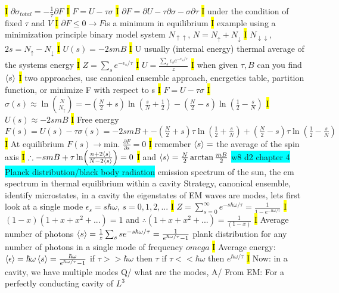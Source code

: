\documentclass[fontsize=4pt]{scrartcl}
\begin{document}
\hl{I}
$\partial \sigma_{total} = - \frac{1}{\tau} \partial F$
\hl{I}
$F=U-\tau \sigma$
\hl{I}
$\partial F = \partial U - \tau \partial \sigma - \sigma \partial \tau$
\hl{I}
under the condition of fixed $\tau$ and $V$
\hl{I}
$\partial F \leq 0 \rightarrow F$is a minimum in equilibrium
\hl{I}
\colorbox{RubineRed}{example using a minimization principle}
binary model system $N_{\uparrow \uparrow}$, $N = N_{\uparrow} + N_{\downarrow}$
\hl{I}
$N_{\downarrow \downarrow}$, $2s = N_{\uparrow} - N_{\downarrow}$
\hl{I}
$U(s) = -2smB$
\hl{I}
U usually (internal energy) thermal average of the systems energy
\hl{I}
$Z=\sum_s e^{-\epsilon_s / \tau}$
\hl{I}
$U = \frac{\sum_s \epsilon_s e^{-\epsilon_s / \tau}}{z}$
\hl{I}
when given $\tau, B$ can you find $\expval{s}$
\hl{I}
two approaches, use canonical ensemble approach, energetics table, partition function, or minimize F with respect to s
\hl{I}
$F=U-\tau \sigma$
\hl{I}
$\sigma (s) \approx \ln  {{N}\choose{N_{\uparrow}}} = -(\frac{N}{2}+s) \ln(\frac{s}{N}+\frac{1}{2})-(\frac{N}{2} - s)\ln(\frac{1}{2} - \frac{s}{N}) $
\hl{I}
$U(s) \approx -2smB$
\hl{I}
Free energy $F(s) = U(s) - \tau \sigma (s) = -2smB + -(\frac{N}{2}+s) \tau \ln(\frac{1}{2}+\frac{s}{N}) + (\frac{N}{2} - s) \tau \ln(\frac{1}{2} - \frac{s}{N})$
\hl{I}
At equilibrium $F(s) \rightarrow $min. $\frac{\partial F}{\partial s} = 0$
\hl{I}
\colorbox{RubineRed}{remember} $\expval{s}=$ the average of the spin axis 
\hl{I}
$\therefore -smB + \tau \ln (\frac{n+2\expval{s}}{N-2\expval{s}}) = 0$
\hl{I}
and $\expval{s} = \frac{N}{2} \arctan \frac{mB}{2}$
\colorbox{Cyan}{w8 d2 chapter 4 Planck distribution/black body radiation}
emission spectrum of the sun, the em spectrum in thermal equilibrium within a cavity
Strategy, canonical ensemble, identify microstates, in a cavity the eigenstates of EM waves are modes, lets first look at a single mode
$\epsilon_s = s\hbar \omega$, $s =0,1,2,...$
\hl{I}
$Z = \sum_{s=0}^{\infty} e^{-s\hbar \omega/ \tau} = \frac{1}{1-e^{-\hbar \omega / \tau}}$
\hl{I}
$(1-x)(1+x+x^2+...)=1$ and $\therefore (1+x+x^2+...) = \frac{1}{(1-x)}$
\hl{I}
Average number of photons
$\expval{s} = \frac{1}{z} \sum_{s} se^{-s\hbar \omega / \tau} = \frac{1}{e^{\hbar \omega / \tau} - 1}$ plank distribution for any number of photons in a single mode of frequency $omega$
\hl{I}
Average energy: $\expval{\epsilon} = \hbar \omega \expval{s} = \frac{\hbar \omega}{e^{\hbar \omega /\tau}-1}$ if $\tau >> \hbar \omega$ then $\tau$ if $\tau << \hbar \omega $ then $e^{\hbar \omega /\tau}$
\hl{I}
Now: in a cavity, we have multiple modes
Q/ what are the modes, A/ From EM: For a perfectly conducting cavity of $L^3$
\end{document}
